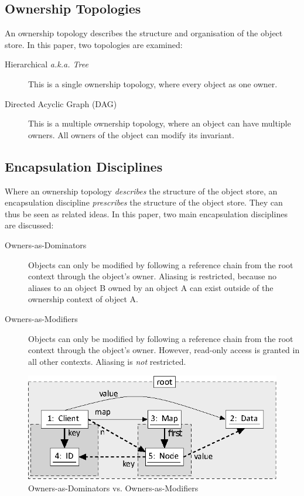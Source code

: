 \documentclass{acm_proc_article-sp}
\begin{document}
\subsection{Ownership Topologies}
\label{subsec:topologies}

An ownership topology describes the structure and organisation of the
object store. In this paper, two topologies are examined:

\begin{description}
	\item[Hierarchical \emph{a.k.a. Tree}] This is a single ownership topology,
		\linebreak where every object as one owner.
	\item[Directed Acyclic Graph (DAG)] This is a multiple ownership \linebreak
		topology, where an object can have multiple owners. All owners of the
		object can modify its invariant.
\end{description}

\subsection{Encapsulation Disciplines}
\label{subsec:encapsulation}

Where an ownership topology \emph{describes} the structure of the object store,
an encapsulation discipline \emph{prescribes} the structure of the object
store. They can thus be seen as related ideas. In this paper, two main
encapsulation disciplines are discussed:

\begin{description}
	\item[Owners-as-Dominators] Objects can only be modified by following a
		reference chain from the root context through the object's owner.
		Aliasing is restricted, because no aliases to an object B owned by an
		object A can exist outside of the ownership context of object A.
	\item[Owners-as-Modifiers] Objects can only be modified by following a
		reference chain from the root context through the object's owner.
		However, read-only access is granted in all other contexts. Aliasing is
		\emph{not} restricted.
\end{description}

\begin{figure}[t]
	\centering
	\includegraphics{ownership-dominator-vs-modifier.eps}
	\caption{Owners-as-Dominators vs. Owners-as-Modifiers}
	\label{fig:ownership-dominator-vs-modifier}
\end{figure}
\end{document}
